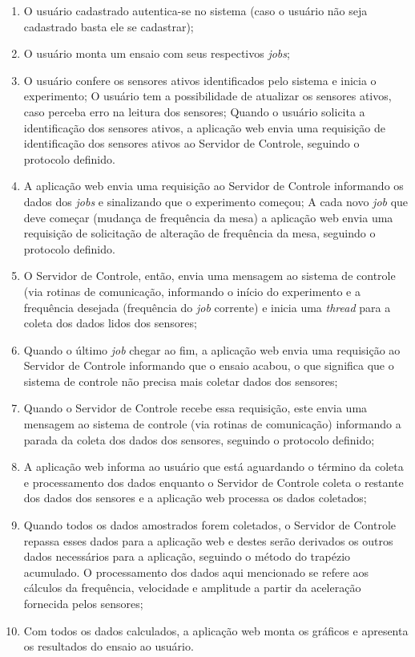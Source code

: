 \begin{enumerate}
 \item O usuário cadastrado autentica-se no sistema (caso o usuário não seja cadastrado basta ele se cadastrar);
 \item O usuário monta um ensaio com seus respectivos \textit{jobs};
 \item O usuário confere os sensores ativos identificados pelo sistema e inicia o experimento;
    \subitem O usuário tem a possibilidade de atualizar os sensores ativos, caso perceba erro na leitura dos sensores;
    \subitem Quando o usuário solicita a identificação dos sensores ativos, a aplicação web envia uma requisição de identificação dos sensores ativos ao Servidor de Controle, seguindo o protocolo definido.
 \item A aplicação web envia uma requisição ao Servidor de Controle informando os dados dos \textit{jobs} e sinalizando que o experimento começou;
       \subitem A cada novo \textit{job} que deve começar (mudança de frequência da mesa) a aplicação web envia uma requisição de solicitação de alteração de frequência da mesa, seguindo o protocolo definido.
 \item O Servidor de Controle, então, envia uma mensagem ao sistema de controle (via rotinas de comunicação, informando o início do experimento e a frequência desejada (frequência do \textit{job} corrente) e inicia uma \textit{thread} para a coleta dos dados lidos dos sensores;
 \item Quando o último \textit{job} chegar ao fim, a aplicação web envia uma requisição ao Servidor de Controle informando que o ensaio acabou, o que significa que o sistema de controle não precisa mais coletar dados dos sensores;
 \item Quando o Servidor de Controle recebe essa requisição, este envia uma mensagem ao sistema de controle (via rotinas de comunicação) informando a parada da coleta dos dados dos sensores, seguindo o protocolo definido;
 \item A aplicação web informa ao usuário que está aguardando o término da coleta e processamento dos dados enquanto o Servidor de Controle coleta o restante dos dados dos sensores e a aplicação web processa os dados coletados;
 \item Quando todos os dados amostrados forem coletados, o Servidor de Controle repassa esses dados para a aplicação web e destes serão derivados os outros dados necessários para a aplicação, seguindo o método do trapézio acumulado. O processamento dos dados aqui mencionado se refere aos cálculos da frequência, velocidade e amplitude a partir da aceleração fornecida pelos sensores;
 \item Com todos os dados calculados, a aplicação web monta os gráficos e apresenta os resultados do ensaio ao usuário.
\end{enumerate}

